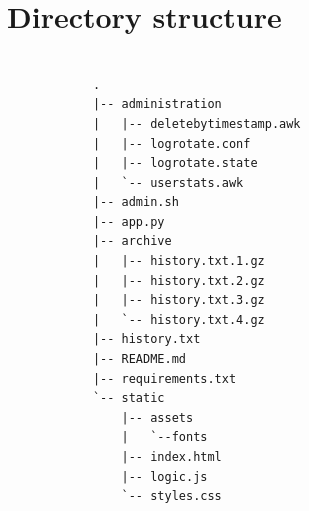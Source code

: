 \documentclass{article}
\begin{document}
    \section{Directory structure}
    
    \begin{verbatim}
                
            .
            |-- administration
            |   |-- deletebytimestamp.awk
            |   |-- logrotate.conf
            |   |-- logrotate.state
            |   `-- userstats.awk
            |-- admin.sh
            |-- app.py
            |-- archive
            |   |-- history.txt.1.gz
            |   |-- history.txt.2.gz
            |   |-- history.txt.3.gz
            |   `-- history.txt.4.gz
            |-- history.txt
            |-- README.md
            |-- requirements.txt
            `-- static
                |-- assets
                |   `--fonts
                |-- index.html
                |-- logic.js
                `-- styles.css
\end{verbatim}
\end{document}
